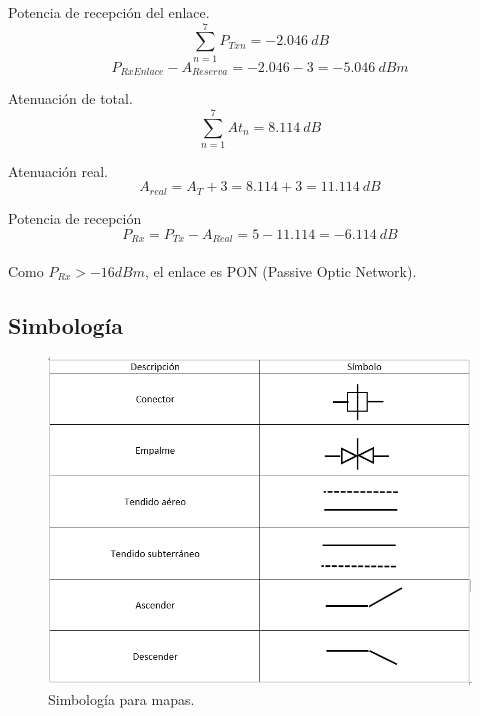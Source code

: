 \documentclass[12pt,letterpaper]{article}
\begin{document}
Potencia de recepción del enlace.
\begin{equation}
    \sum_{n=1}^{7} P_{Txn} = -2.046 \ dB
\end{equation}
\begin{equation}
    P_{RxEnlace}-A_{Reserva}=-2.046-3=-5.046 \ dBm
\end{equation}

Atenuación de total.
\begin{equation}
    \sum_{n=1}^{7} At_n = 8.114 \ dB
\end{equation}

Atenuación real.
\begin{equation}
    A_{real}=A_T+3=8.114+3=11.114 \ dB
\end{equation}

Potencia de recepción
\begin{equation}
    P_{Rx}=P_{Tx}-A_{Real}=5-11.114=-6.114 \ dB
\end{equation}
\\
Como $P_{Rx}>-16dBm$, el enlace es PON (Passive Optic Network).

\newpage
\subsection{Simbología}
\begin{figure}[ht]
    \centering
    \includegraphics[scale=.7]{imagenes/simbo.png}
    \caption{Simbología para mapas.}
\end{figure}

\newpage
\end{document}
